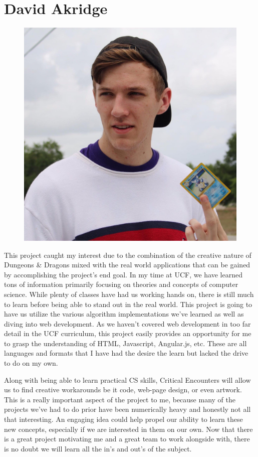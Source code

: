 \documentclass[12pt,a4paper]{report}
\begin{document}
	\newpage
	\section{David Akridge}
	\begin{figure}
		\includegraphics[scale=0.05]{David_Akridge}
	\end{figure}
	This project caught my interest due to the combination of the creative nature of Dungeons \& Dragons mixed with the real world applications that can be gained by accomplishing the project’s end goal. In my time at UCF, we have learned tons of information primarily focusing on theories and concepts of computer science. While plenty of classes have had us working hands on, there is still much to learn before being able to stand out in the real world. This project is going to have us utilize the various algorithm implementations we’ve learned as well as diving into web development. As we haven’t covered web development in too far detail in the UCF curriculum, this project easily provides an opportunity for me to grasp the understanding of HTML, Javascript, Angular.js, etc. These are all languages and formats that I have had the desire the learn but lacked the drive to do on my own. \par
	Along with being able to learn practical CS skills, Critical Encounters will allow us to find creative workarounds be it code, web-page design, or even artwork. This is a really important aspect of the project to me, because many of the projects we’ve had to do prior have been numerically heavy and honestly not all that interesting. An engaging idea could help propel our ability to learn these new concepts, especially if we are interested in them on our own. Now that there is a great project motivating me and a great team to work alongside with, there is no doubt we will learn all the in’s and out’s of the subject. 
	
\end{document}
